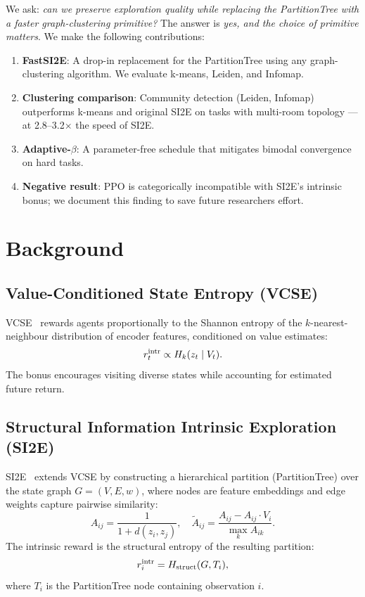 \documentclass[10pt,twocolumn]{article}
\newcommand{\fastsi}{FastSI2E}
\newcommand{\si}{SI2E}
\newcommand{\ptree}{PartitionTree}
\begin{document}
We ask: \emph{can we preserve exploration quality while replacing the \ptree{} with
a faster graph-clustering primitive?} The answer is \emph{yes, and the choice of
primitive matters}. We make the following contributions:

\begin{enumerate}\itemsep0pt
  \item \textbf{\fastsi{}}: A drop-in replacement for the \ptree{} using any
    graph-clustering algorithm. We evaluate k-means, Leiden, and Infomap.
  \item \textbf{Clustering comparison}: Community detection (Leiden, Infomap)
    outperforms k-means and original \si{} on tasks with multi-room topology ---
    at 2.8--3.2$\times$ the speed of \si{}.
  \item \textbf{Adaptive-$\beta$}: A parameter-free schedule that mitigates bimodal
    convergence on hard tasks.
  \item \textbf{Negative result}: PPO is categorically incompatible with \si{}'s
    intrinsic bonus; we document this finding to save future researchers effort.
\end{enumerate}

\section{Background}

\subsection{Value-Conditioned State Entropy (VCSE)}

VCSE~\citep{vcse2022} rewards agents proportionally to the Shannon entropy of the
$k$-nearest-neighbour distribution of encoder features, conditioned on value
estimates:
\[
  r^{\rm intr}_t \propto H_k(z_t \mid V_t).
\]
The bonus encourages visiting diverse states while accounting for estimated future
return.

\subsection{Structural Information Intrinsic Exploration (SI2E)}

\si{}~\citep{si2e2024} extends VCSE by constructing a hierarchical partition
(\ptree{}) over the state graph $G=(V,E,w)$, where nodes are feature embeddings
and edge weights capture pairwise similarity:
\[
  A_{ij} = \frac{1}{1 + d(z_i, z_j)},
  \quad
  \tilde{A}_{ij} = \frac{A_{ij} - A_{ij}\cdot V_i}{\max_k A_{ik}}.
\]
The intrinsic reward is the structural entropy of the resulting partition:
\[
  r^{\rm intr}_i = H_{\rm struct}(G, T_i),
\]
where $T_i$ is the \ptree{} node containing observation $i$.
\end{document}
